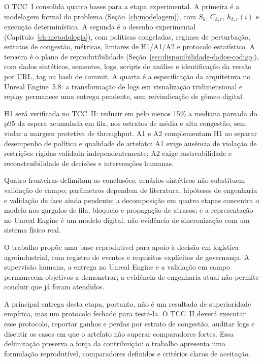 \documentclass[
  12pt,
  oneside,
  a4paper,
  sumario=tradicional,
  brazil
]{abntex2}
\begin{document}
O TCC~I consolida quatro bases para a etapa experimental. A primeira \'e a modelagem formal do problema (Se\c{c}\~ao~\ref{ch:modelagem}), com $S_k$, $C_{k,r}$, $h_{k,r}(i)$ e execu\c{c}\~ao determin\'istica. A segunda \'e o desenho experimental (Cap\'itulo~\ref{ch:metodologia}), com pol\'iticas congeladas, regimes de perturba\c{c}\~ao, estratos de congest\~ao, m\'etricas, limiares de H1/A1/A2 e protocolo estat\'istico. A terceira \'e o plano de reprodutibilidade (Se\c{c}\~ao~\ref{sec:disponibilidade-dados-codigo}), com dados sint\'eticos, sementes, logs, scripts de an\'alise e identifica\c{c}\~ao da vers\~ao por URL, tag ou hash de commit. A quarta \'e a especifica\c{c}\~ao da arquitetura no Unreal Engine~5.8: a transforma\c{c}\~ao de logs em visualiza\c{c}\~ao tridimensional e replay permanece uma entrega pendente, sem reivindica\c{c}\~ao de g\^emeo digital.

H1 ser\'a verificada no TCC~II: reduzir em pelo menos 15\% a mediana pareada do p95 da espera acumulada em fila, nos estratos de m\'edia e alta congest\~ao, sem violar a margem protetiva de throughput. A1 e A2 complementam H1 ao separar desempenho de pol\'itica e qualidade de artefato: A1 exige aus\^encia de viola\c{c}\~ao de restri\c{c}\~oes r\'igidas validada independentemente; A2 exige rastreabilidade e reconstruibilidade de decis\~oes e interven\c{c}\~oes humanas.

Quatro fronteiras delimitam as conclus\~oes: cen\'arios sint\'eticos n\~ao substituem valida\c{c}\~ao de campo; par\^ametros dependem de literatura, hip\'oteses de engenharia e valida\c{c}\~ao de face ainda pendente; a decomposi\c{c}\~ao em quatro etapas concentra o modelo nos gargalos de fila, bloqueio e propaga\c{c}\~ao de atrasos; e a representa\c{c}\~ao no Unreal Engine \'e um modelo digital, n\~ao evid\^encia de sincroniza\c{c}\~ao com um sistema f\'isico real.

O trabalho prop\~oe uma base reprodut\'ivel para apoio \`a decis\~ao em log\'istica agroindustrial, com registro de eventos e requisitos expl\'icitos de governan\c{c}a. A supervis\~ao humana, a entrega no Unreal Engine e a valida\c{c}\~ao em campo permanecem objetivos a demonstrar; a evid\^encia de engenharia atual n\~ao permite concluir que j\'a foram atendidos.

A principal entrega desta etapa, portanto, n\~ao \'e um resultado de superioridade emp\'irica, mas um protocolo fechado para test\'a-la. O TCC~II dever\'a executar esse protocolo, reportar ganhos e perdas por estrato de congest\~ao, auditar logs e discutir os casos em que o artefato n\~ao superar comparadores fortes. Essa delimita\c{c}\~ao preserva a for\c{c}a da contribui\c{c}\~ao: o trabalho apresenta uma formula\c{c}\~ao reprodut\'ivel, comparadores definidos e crit\'erios claros de aceita\c{c}\~ao.
\end{document}
